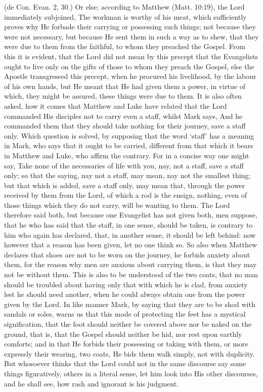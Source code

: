  (de Con. Evan. 2, 30.) Or else; according to Matthew (Matt. 10:19), the Lord immediately subjoined, The workman is worthy of his meat, which sufficiently proves why He forbade their carrying or possessing such things; not because they were not necessary, but because He sent them in such a way as to shew, that they were due to them from the faithful, to whom they preached the Gospel. From this it is evident, that the Lord did not mean by this precept that the Evangelists ought to live only on the gifts of those to whom they preach the Gospel, else the Apostle transgressed this precept, when he procured his livelihood, by the labour of his own hands, but He meant that He had given them a power, in virtue of which, they might be assured, these things were due to them. It is also often asked, how it comes that Matthew and Luke have related that the Lord commanded His disciples not to carry even a staff, whilst Mark says, And he commanded them that they should take nothing for their journey, save a staff only. Which question is solved, by supposing that the word ‘staff’ has a meaning in Mark, who says that it ought to be carried, different from that which it bears in Matthew and Luke, who affirm the contrary. For in a concise way one might say, Take none of the necessaries of life with you, nay, not a staff, save a staff only; so that the saying, nay not a staff, may mean, nay not the smallest thing; but that which is added, save a staff only, may mean that, through the power received by them from the Lord, of which a rod is the ensign, nothing, even of those things which they do not carry, will be wanting to them. The Lord therefore said both, but because one Evangelist has not given both, men suppose, that he who has said that the staff, in one sense, should be taken, is contrary to him who again has declared, that, in another sense, it should be left behind: now however that a reason has been given, let no one think so. So also when Matthew declares that shoes are not to be worn on the journey, he forbids anxiety about them, for the reason why men are anxious about carrying them, is that they may not be without them. This is also to be understood of the two coats, that no man should be troubled about having only that with which he is clad, from anxiety lest he should need another, when he could always obtain one from the power given by the Lord. In like manner Mark, by saying that they are to be shod with sandals or soles, warns us that this mode of protecting the feet has a mystical signification, that the foot should neither be covered above nor be naked on the ground, that is, that the Gospel should neither be hid, nor rest upon earthly comforts; and in that He forbids their possessing or taking with them, or more expressly their wearing, two coats, He bids them walk simply, not with duplicity. But whosoever thinks that the Lord could not in the same discourse say some things figuratively, others in a literal sense, let him look into His other discourses, and he shall see, how rash and ignorant is his judgment.

